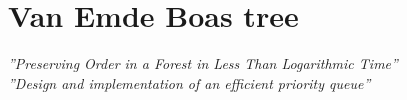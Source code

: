 \section{Van Emde Boas tree}

\emph{''Preserving Order in a Forest in Less Than Logarithmic Time''} \cite{vanEmdeBoas1975}\\
\emph{''Design and implementation of an efficient priority queue''} \cite{vanEmdeBoas1976}
